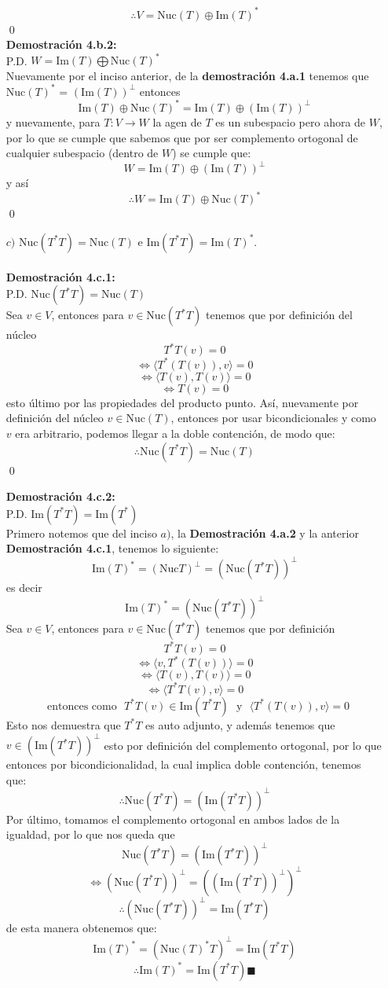 \begin{itemize}
     \[\therefore V=\text{Nuc}(T)\oplus \text{Im}(T)^*\]\qed\\
    \textbf{Demostraci\'on 4.b.2:}\\
    P.D. $W=\text{Im}(T)\bigoplus \text{Nuc}(T)^*$\\
    Nuevamente por el inciso anterior, de la \textbf{demostración 4.a.1} tenemos que $\text{Nuc}(T)^*$ = $(\text{Im}(T))^\perp $ entonces
    \[\text{Im}(T)\oplus \text{Nuc}(T)^* = \text{Im}(T)\oplus (\text{Im}(T))^\perp\] 
    y nuevamente, para $T:V\longrightarrow W$ la agen de $T$
es un subespacio pero ahora de $W$, por lo que se cumple que sabemos que por ser complemento ortogonal de cualquier subespacio (dentro de $W$) se cumple que:
\[W=\text{Im}(T)\oplus (\text{Im}(T))^\perp\] y así \[\therefore W=\text{Im}(T)\oplus \text{Nuc}(T)^*\]\qed
    \item [$c)$] $\text{Nuc}(T^* T)=\text{Nuc}(T)$ e $\text{Im}(T^*T)=\text{Im}(T)^*$.\\\\
     \textbf{Demostraci\'on 4.c.1:}\\
     P.D. $\text{Nuc}(T^*T)=\text{Nuc}(T)$\\
     Sea $v\in V$, entonces para $v \in \text{Nuc}(T^*T)$ tenemos que por definición del núcleo \[T^*T(v)=0\] \[\Longleftrightarrow \langle T^*(T(v)),v\rangle=0\]\[\Longleftrightarrow \langle T(v),T(v)\rangle=0\]\[\Longleftrightarrow T(v)=0\] esto último por las propiedades del producto punto. Así, nuevamente por definición del núcleo $v\in \text{Nuc}(T)$, entonces por usar bicondicionales y como $v$ era arbitrario, podemos llegar a la doble contenci\'on, de modo que: \[\therefore \text{Nuc}(T^*T)=\text{Nuc}(T)\]\qed
     
    \textbf{Demostraci\'on 4.c.2:}\\
    P.D. $\text{Im}(T^*T)=\text{Im}(T^*)$\\
    Primero notemos que del inciso $a)$, la \textbf{Demostración 4.a.2} y la anterior \textbf{Demostración 4.c.1}, tenemos lo siguiente:\[\text{Im}(T)^*=(\text{Nuc} T)^\perp = (\text{Nuc}(T^*T))^\perp\] es decir \[\text{Im}(T)^* = (\text{Nuc}(T^*T))^\perp \] 
    Sea $v\in V$, entonces para $v\in \text{Nuc}(T^*T)$ tenemos que por definición\[T^*T(v)=0\] \[\Longleftrightarrow \langle v,T^*(T(v))\rangle=0\] \[\Longleftrightarrow \langle T(v),T(v)\rangle=0\] \[\Longleftrightarrow \langle T^*T(v),v\rangle=0\] \[~~~\text{entonces como}~~~T^*T(v)\in \text{Im}(T^*T)~~~\text{y}~~~\langle T^*(T(v)),v\rangle=0 \]Esto nos demuestra que $T^*T$ es auto adjunto, y adem\'as tenemos que $v\in (\text{Im}(T^*T))^\perp$ esto por definición del complemento ortogonal, por lo que entonces por bicondicionalidad, la cual implica doble contenci\'on, tenemos que:
    \[\therefore \text{Nuc}(T^*T)=(\text{Im}(T^*T))^\perp\] Por último, tomamos el complemento ortogonal en ambos lados de la igualdad, por lo que nos queda que \[\text{Nuc}(T^*T)=(\text{Im}(T^*T))^\perp\] \[\Longleftrightarrow (\text{Nuc}(T^*T))^\bot=((\text{Im}(T^*T))^\perp)^\bot\] \[\therefore (\text{Nuc}(T^*T))^\bot=\text{Im}(T^*T) \] de esta manera obtenemos que: \[\text{Im}(T)^* = (\text{Nuc}(T)^*T)^\perp=\text{Im}(T^*T)\] \[\therefore \text{Im}(T)^* =\text{Im}(T^*T) \blacksquare\]
    
\end{itemize}   